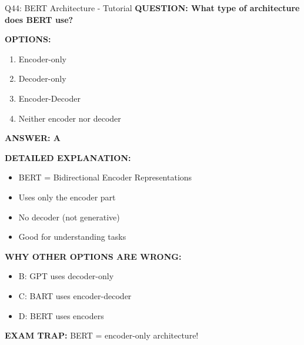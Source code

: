 \documentclass[8pt]{beamer}
\begin{document}
	\begin{frame}{Q44: BERT Architecture - Tutorial}
		\fontsize{6.5}{7.5}\selectfont
		\textbf{QUESTION: What type of architecture does BERT use?}
		
		\vspace{0.1cm}
		\textbf{OPTIONS:}
		\begin{enumerate}
			\item Encoder-only
			\item Decoder-only
			\item Encoder-Decoder
			\item Neither encoder nor decoder
		\end{enumerate}
		
		\vspace{0.1cm}
		\textcolor{myblue}{\textbf{ANSWER: A}}
		
		\vspace{0.1cm}
		\textbf{DETAILED EXPLANATION:}
		\begin{itemize}
			\item BERT = Bidirectional Encoder Representations
			\item Uses only the encoder part
			\item No decoder (not generative)
			\item Good for understanding tasks
		\end{itemize}
		
		\vspace{0.1cm}
		\textcolor{myred}{\textbf{WHY OTHER OPTIONS ARE WRONG:}}
		\begin{itemize}
			\item \textcolor{myred}{B:} GPT uses decoder-only
			\item \textcolor{myred}{C:} BART uses encoder-decoder
			\item \textcolor{myred}{D:} BERT uses encoders
		\end{itemize}
		
		\textcolor{myred}{\textbf{EXAM TRAP:}} BERT = \textcolor{myblue}{encoder-only} architecture!
	\end{frame}
	
\end{document}
